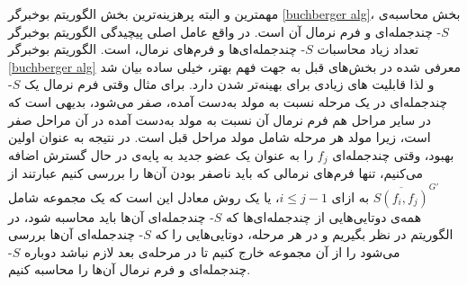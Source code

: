 مهمترین و البته پرهزینه‌ترین بخش الگوریتم بوخبرگر
\ref{buchberger alg}،
 بخش محاسبه‌ی 
 $S$-
 چندجمله‌ای و 
 فرم نرمال آن است. در واقع عامل اصلی پیچیدگی الگوریتم بوخبرگر تعداد زیاد محاسبات 
$S$-
چندجمله‌ای‌ها و فرم‌های نرمال، است. الگوریتم بوخبرگر 
\ref{buchberger alg}
معرفی شده در بخش‌های قبل به جهت فهم بهتر، خیلی ساده بیان شد و لذا قابلیت ‌های زیادی برای بهینه‌تر شدن دارد. برای مثال وقتی فرم نرمال یک 
$S$-
چندجمله‌ای در یک مرحله نسبت به مولد به‌دست  آمده، صفر می‌شود، بدیهی است که در سایر مراحل هم فرم نرمال آن نسبت به مولد به‌دست  آمده در آن مراحل صفر است، زیرا مولد هر مرحله شامل مولد مراحل قبل است. در نتیجه به عنوان اولین  بهبود، وقتی چندجمله‌ای 
$f_{j}$
را به عنوان یک عضو جدید به پایه‌ی در حال گسترش اضافه می‌کنیم، تنها فرم‌های نرمالی که باید ناصفر بودن آن‌ها را بررسی کنیم عبارتند از 
$\overline{S(f_{i},f_{j})}^{G'}$
به ازای 
$i\leq j-1$،
یا یک روش معادل این است که یک مجموعه‌ شامل همه‌ی دوتایی‌هایی از چندجمله‌ای‌ها که 
$S$-
چندجمله‌ای‌ آن‌ها باید محاسبه شود، در الگوریتم در نظر بگیریم و در هر مرحله، دوتایی‌هایی را که 
$S$-
چندجمله‌ای‌ آن‌ها بررسی می‌شود را از آن مجموعه خارج کنیم تا در مرحله‌ی بعد لازم نباشد دوباره 
$S$-
چندجمله‌ای و فرم نرمال آن‌ها را محاسبه کنیم.
%

